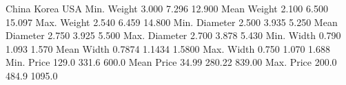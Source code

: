                China  Korea    USA
Min. Weight    3.000  7.296 12.900
Mean Weight    2.100  6.500 15.097
Max. Weight    2.540  6.459 14.800
Min. Diameter  2.500  3.935  5.250
Mean Diameter  2.750  3.925  5.500
Max. Diameter  2.700  3.878  5.430
Min. Width     0.790  1.093  1.570
Mean Width    0.7874 1.1434 1.5800
Max. Width     0.750  1.070  1.688
Min. Price     129.0  331.6  600.0
Mean Price     34.99 280.22 839.00
Max. Price     200.0  484.9 1095.0
